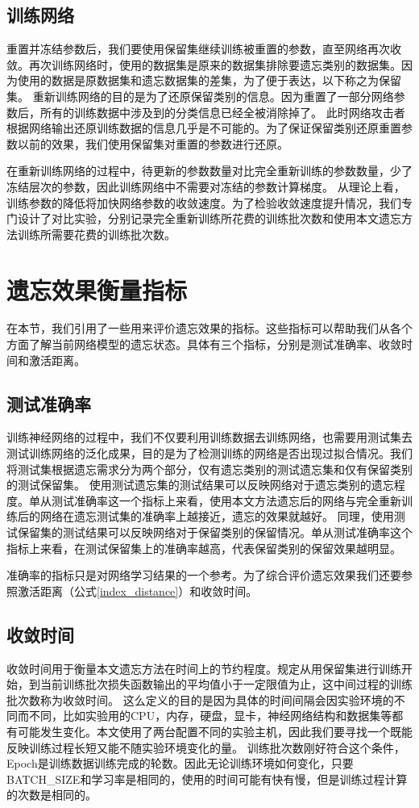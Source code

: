 \subsection{训练网络}
重置并冻结参数后，我们要使用保留集继续训练被重置的参数，直至网络再次收敛。再次训练网络时，使用的数据集是原来的数据集排除要遗忘类别的数据集。因为使用的数据是原数据集和遗忘数据集的差集，为了便于表达，以下称之为保留集。
重新训练网络的目的是为了还原保留类别的信息。因为重置了一部分网络参数后，所有的训练数据中涉及到的分类信息已经全被消除掉了。
此时网络攻击者根据网络输出还原训练数据的信息几乎是不可能的。为了保证保留类别还原重置参数以前的效果，我们使用保留集对重置的参数进行还原。

在重新训练网络的过程中，待更新的参数数量对比完全重新训练的参数数量，少了冻结层次的参数，因此训练网络中不需要对冻结的参数计算梯度。
从理论上看，训练参数的降低将加快网络参数的收敛速度。为了检验收敛速度提升情况，我们专门设计了对比实验，分别记录完全重新训练所花费的训练批次数和使用本文遗忘方法训练所需要花费的训练批次数。

\section{遗忘效果衡量指标} \label{forget_evaluation_index}
在本节，我们引用了一些用来评价遗忘效果的指标。这些指标可以帮助我们从各个方面了解当前网络模型的遗忘状态。具体有三个指标，分别是测试准确率、收敛时间和激活距离。

\subsection{测试准确率}
训练神经网络的过程中，我们不仅要利用训练数据去训练网络，也需要用测试集去测试训练网络的泛化成果，目的是为了检测训练的网络是否出现过拟合情况。我们将测试集根据遗忘需求分为两个部分，仅有遗忘类别的测试遗忘集和仅有保留类别的测试保留集。
使用测试遗忘集的测试结果可以反映网络对于遗忘类别的遗忘程度。单从测试准确率这一个指标上来看，使用本文方法遗忘后的网络与完全重新训练后的网络在遗忘测试集的准确率上越接近，遗忘的效果就越好。
同理，使用测试保留集的测试结果可以反映网络对于保留类别的保留情况。单从测试准确率这个指标上来看，在测试保留集上的准确率越高，代表保留类别的保留效果越明显。

准确率的指标只是对网络学习结果的一个参考。为了综合评价遗忘效果我们还要参照激活距离（公式\ref{index_distance}）和收敛时间。

\subsection{收敛时间}
收敛时间用于衡量本文遗忘方法在时间上的节约程度。规定从用保留集进行训练开始，到当前训练批次损失函数输出的平均值小于一定限值为止，这中间过程的训练批次数称为收敛时间。
这么定义的目的是因为具体的时间间隔会因实验环境的不同而不同，比如实验用的CPU，内存，硬盘，显卡，神经网络结构和数据集等都有可能发生变化。本文使用了两台配置不同的实验主机，因此我们要寻找一个既能反映训练过程长短又能不随实验环境变化的量。
训练批次数刚好符合这个条件，Epoch是训练数据训练完成的轮数。因此无论训练环境如何变化，只要BATCH\_SIZE和学习率是相同的，使用的时间可能有快有慢，但是训练过程计算的次数是相同的。

